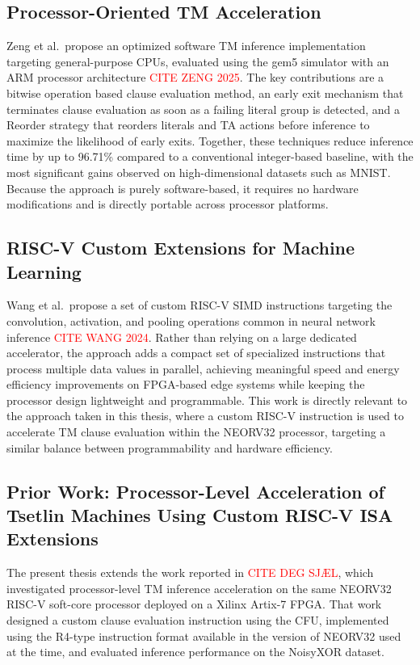 \subsection{Processor-Oriented TM Acceleration}
\label{sec:related_processor}

Zeng et al.\ propose an optimized software TM inference implementation targeting general-purpose CPUs, evaluated using the gem5 simulator with an ARM processor architecture \textcolor{red}{CITE ZENG 2025}. The key contributions are a bitwise operation based clause evaluation method, an early exit mechanism that terminates clause evaluation as soon as a failing literal group is detected, and a Reorder strategy that reorders literals and TA actions before inference to maximize the likelihood of early exits. Together, these techniques reduce inference time by up to 96.71\% compared to a conventional integer-based baseline, with the most significant gains observed on high-dimensional datasets such as MNIST. Because the approach is purely software-based, it requires no hardware modifications and is directly portable across processor platforms.

\subsection{RISC-V Custom Extensions for Machine Learning}
\label{sec:related_riscv}

Wang et al.\ propose a set of custom RISC-V SIMD instructions targeting the convolution, activation, and pooling operations common in neural network inference \textcolor{red}{CITE WANG 2024}. Rather than relying on a large dedicated accelerator, the approach adds a compact set of specialized instructions that process multiple data values in parallel, achieving meaningful speed and energy efficiency improvements on FPGA-based edge systems while keeping the processor design lightweight and programmable. This work is directly relevant to the approach taken in this thesis, where a custom RISC-V instruction is used to accelerate TM clause evaluation within the NEORV32 processor, targeting a similar balance between programmability and hardware efficiency.

\subsection{Prior Work: Processor-Level Acceleration of Tsetlin Machines
Using Custom RISC-V ISA Extensions}
\label{sec:related_prior}

The present thesis extends the work reported in \textcolor{red}{CITE DEG SJÆL}, which investigated processor-level TM inference acceleration on the same NEORV32 RISC-V soft-core processor deployed on a Xilinx Artix-7 FPGA. That work designed a custom clause evaluation instruction using the CFU, implemented using the R4-type instruction format available in the version of NEORV32 used at the time, and evaluated inference performance on the NoisyXOR dataset.

